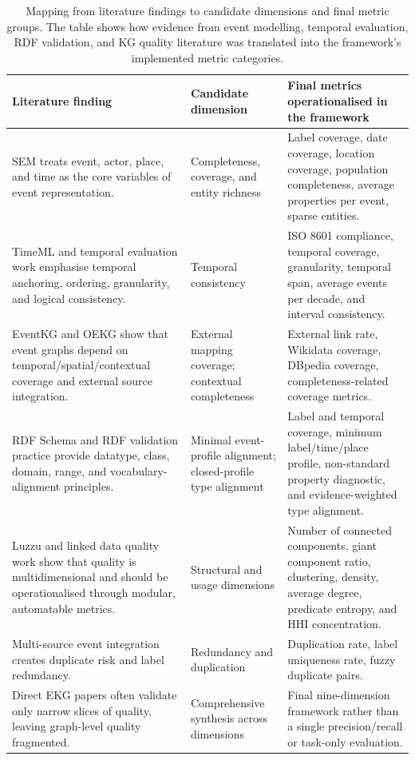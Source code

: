 \begin{table}[htbp]
\centering
\scriptsize
\caption{Mapping from literature findings to candidate dimensions and final metric groups. The table shows how evidence from event modelling, temporal evaluation, RDF validation, and KG quality literature was translated into the framework's implemented metric categories.}
\label{tab:literature_to_metrics_mapping}
\setlength{\tabcolsep}{3pt}
\begin{tabularx}{\textwidth}{>{\raggedright\arraybackslash}p{4.0cm}>{\raggedright\arraybackslash}p{3.0cm}X}
\toprule
\textbf{Literature finding} & \textbf{Candidate dimension} & \textbf{Final metrics operationalised in the framework} \\
\midrule
SEM treats event, actor, place, and time as the core variables of event representation. & Completeness, coverage, and entity richness & Label coverage, date coverage, location coverage, population completeness, average properties per event, sparse entities. \\
TimeML and temporal evaluation work emphasise temporal anchoring, ordering, granularity, and logical consistency. & Temporal consistency & ISO 8601 compliance, temporal coverage, granularity, temporal span, average events per decade, and interval consistency. \\
EventKG and OEKG show that event graphs depend on temporal/spatial/contextual coverage and external source integration. & External mapping coverage; contextual completeness & External link rate, Wikidata coverage, DBpedia coverage, completeness-related coverage metrics. \\
RDF Schema and RDF validation practice provide datatype, class, domain, range, and vocabulary-alignment principles. & Minimal event-profile alignment; closed-profile type alignment & Label and temporal coverage, minimum label/time/place profile, non-standard property diagnostic, and evidence-weighted type alignment. \\
Luzzu and linked data quality work show that quality is multidimensional and should be operationalised through modular, automatable metrics. & Structural and usage dimensions & Number of connected components, giant component ratio, clustering, density, average degree, predicate entropy, and HHI concentration. \\
Multi-source event integration creates duplicate risk and label redundancy. & Redundancy and duplication & Duplication rate, label uniqueness rate, fuzzy duplicate pairs. \\
Direct EKG papers often validate only narrow slices of quality, leaving graph-level quality fragmented. & Comprehensive synthesis across dimensions & Final nine-dimension framework rather than a single precision/recall or task-only evaluation. \\

\end{tabularx}
\end{table}
